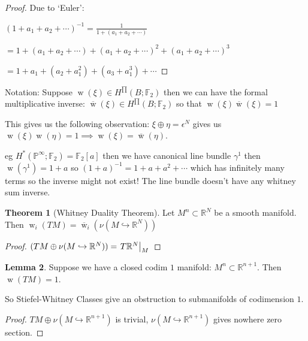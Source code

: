 \documentclass{article}
\theoremstyle{definition}
\newtheorem{theorem}{Theorem}
\newtheorem{lemma}[theorem]{Lemma}
\begin{document}
    \begin{proof}
        Due to `Euler':

        \((1 + a_1 + a_2 + \cdots ) ^{-1}  = \frac{1}{1+(a_1 + a_2 + \cdots)}\)
        
        \(= 1 + (a_1 + a_2 + \cdots ) + (a_1 + a_2 + \cdots)^2 + (a_1 + a_2 + \cdots)^3\)

        \(= 1 + a_1 + (a_2 + a_1^2) + (a_3 + a_1^3) + \cdots\) 
        
        
    \end{proof}

    Notation: Suppose \(\operatorname{w}(\xi) \in H^{\prod} (B;\mathbb{F}_2)\) then we can have the formal multiplicative inverse: \(\overline{\operatorname{w}}(\xi) \in H^{\prod } (B;\mathbb{F}_2)\) so that \(\operatorname{w} (\xi) \overline{\operatorname{w}}(\xi) = 1\)  

    This gives us the following observation: \(\xi \oplus \eta = \epsilon^N\) gives us \(\operatorname{w}(\xi) \operatorname{w}(\eta) = 1 \implies \operatorname{w}(\xi) = \overline{\operatorname{w}}(\eta)\).
    
    eg \(H^{\ast} (\mathbb{P}^{\infty} ;\mathbb{F}_2) = \mathbb{F}_2[a]\) then we have canonical line bundle \(\gamma^1\) then \(\operatorname{w} (\gamma^1) = 1+a\) so \((1+a)^{-1} = 1 + a + a^2 + \cdots\) which has infinitely many terms so the inverse might not exist! The line bundle doesn't have any whitney sum inverse.

    \begin{theorem}
        [Whitney Duality Theorem] Let \(M^n \subset \mathbb{R} ^N\) be a smooth manifold. Then \(\operatorname{w}_i(TM) = \overline{\operatorname{w}}_i \left( \nu (M \hookrightarrow \mathbb{R}^N) \right)  \) 
    \end{theorem}

    \begin{proof}
        \((TM \oplus \nu (M \hookrightarrow \mathbb{R}^N)) = \eval{T\mathbb{R}^N}_M\) 
    \end{proof}

    \begin{lemma}
        Suppose we have a closed codim \(1\) manifold: \(M^n \subset \mathbb{R}^{n+1}\). Then \(\operatorname{w} (TM) = 1\).
    \end{lemma}

    So Stiefel-Whitney Classes give an obstruction to submanifolds of codimension \(1\).

    \begin{proof}
        \(TM \oplus \nu (M \hookrightarrow \mathbb{R}^{n+1})\) is trivial, \(\nu (M \hookrightarrow \mathbb{R}^{n+1})\) gives nowhere zero section.
    \end{proof}
\end{document}
